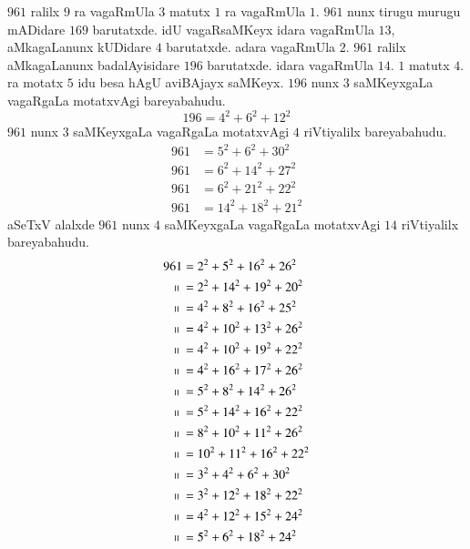 $961$ ralilx $9$ ra vagaRmUla $3$ matutx $1$ ra vagaRmUla $1$. $961$ nunx tirugu murugu mADidare $169$ barutatxde. idU vagaRsaMKeyx idara vagaRmUla $13$, aMka\-gaLanunx kUDidare $4$ barutatxde. adara vagaRmUla $2$. $961$ ralilx aMkagaLanunx badalAyi\-sidare $196$ barutatxde. idara vagaRmUla $14$. $1$ matutx $4$. ra motatx $5$ idu besa hAgU aviBAjayx saMKeyx. $196$ nunx $3$ saMKeyxgaLa vagaRgaLa motatxvAgi bareyabahudu.
$$
196 = 4^2+6^2+12^2
$$
$961$ nunx $3$ saMKeyxgaLa vagaRgaLa motatxvAgi $4$ riVtiyalilx bareyabahudu.
\begin{align*}
961 &= 5^2+6^2+30^2\\
961 &= 6^2+14^2+27^2\\
961 &= 6^2+21^2+22^2\\
961 &= 14^2+18^2+21^2
\end{align*}
aSeTxV alalxde $961$ nunx $4$ saMKeyxgaLa vagaRgaLa motatxvAgi $14$ riVtiyalilx bareyabahudu.
\begin{align*}
961 &= 2^2+5^2+16^2+26^2\\
\shortparallel~   &= 2^2+14^2+19^2+20^2\\
\shortparallel~   &= 4^2+8^2+16^2+25^2\\
\shortparallel~   &= 4^2+10^2+13^2+26^2\\
\shortparallel~   &= 4^2+10^2+19^2+22^2\\
\shortparallel~   &= 4^2+16^2+17^2+26^2\\
\shortparallel~   &= 5^2+8^2+14^2+26^2\\
\shortparallel~   &= 5^2+14^2+16^2+22^2\\
\shortparallel~   &= 8^2+10^2+11^2+26^2\\
\shortparallel~   &= 10^2+11^2+16^2+22^2\\
\shortparallel~   &= 3^2+4^2+6^2+30^2\\
\shortparallel~   &= 3^2+12^2+18^2+22^2\\
\shortparallel~   &= 4^2+12^2+15^2+24^2\\
\shortparallel~   &= 5^2+6^2+18^2+24^2
\end{align*}
